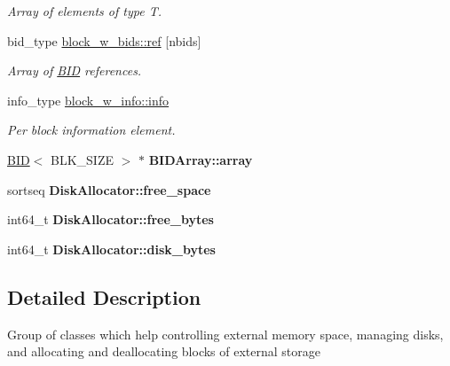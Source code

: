 \begin{CompactItemize}
\begin{CompactList}\small\item\em Array of elements of type T. \item\end{CompactList}\item 
\hypertarget{group__mnglayer_g4809f5f95e04ae33cec5ea5a5edd5db3}{
bid\_\-type \hyperlink{group__mnglayer_g4809f5f95e04ae33cec5ea5a5edd5db3}{block\_\-w\_\-bids::ref} \mbox{[}nbids\mbox{]}}
\label{group__mnglayer_g4809f5f95e04ae33cec5ea5a5edd5db3}

\begin{CompactList}\small\item\em Array of \hyperlink{structBID}{BID} references. \item\end{CompactList}\item 
\hypertarget{group__mnglayer_gbd86ea875a9e866a9c9d7c9d66dc16d0}{
info\_\-type \hyperlink{group__mnglayer_gbd86ea875a9e866a9c9d7c9d66dc16d0}{block\_\-w\_\-info::info}}
\label{group__mnglayer_gbd86ea875a9e866a9c9d7c9d66dc16d0}

\begin{CompactList}\small\item\em Per block information element. \item\end{CompactList}\item 
\hypertarget{group__mnglayer_g9607f31fe990a204cdda84cfac6f083e}{
\hyperlink{structBID}{BID}$<$ BLK\_\-SIZE $>$ $\ast$ \textbf{BIDArray::array}}
\label{group__mnglayer_g9607f31fe990a204cdda84cfac6f083e}

\item 
\hypertarget{group__mnglayer_g4aadf2f84f5172108dcf884523c44849}{
sortseq \textbf{DiskAllocator::free\_\-space}}
\label{group__mnglayer_g4aadf2f84f5172108dcf884523c44849}

\item 
\hypertarget{group__mnglayer_g0258cc36d71c630b7f1a72a4ef516859}{
int64\_\-t \textbf{DiskAllocator::free\_\-bytes}}
\label{group__mnglayer_g0258cc36d71c630b7f1a72a4ef516859}

\item 
\hypertarget{group__mnglayer_g883066b2cc83ba616cf087e94e399617}{
int64\_\-t \textbf{DiskAllocator::disk\_\-bytes}}
\label{group__mnglayer_g883066b2cc83ba616cf087e94e399617}

\end{CompactItemize}


\subsection{Detailed Description}
Group of classes which help controlling external memory space, managing disks, and allocating and deallocating blocks of external storage 

